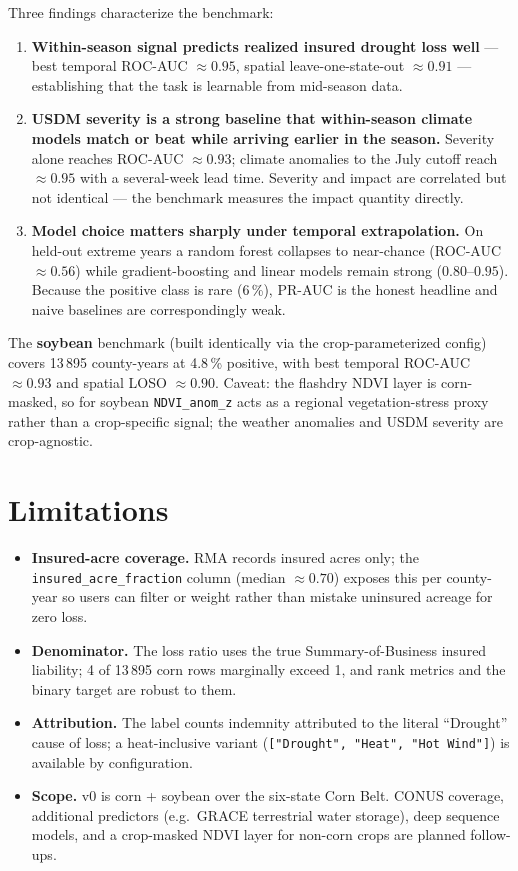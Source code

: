 \documentclass[essd, manuscript]{copernicus}
\begin{document}
Three findings characterize the benchmark:
\begin{enumerate}
\item \textbf{Within-season signal predicts realized insured drought loss well} --- best temporal ROC-AUC $\approx 0.95$, spatial leave-one-state-out $\approx 0.91$ --- establishing that the task is learnable from mid-season data.
\item \textbf{USDM severity is a strong baseline that within-season climate models match or beat while arriving earlier in the season.} Severity alone reaches ROC-AUC $\approx 0.93$; climate anomalies to the July cutoff reach $\approx 0.95$ with a several-week lead time. Severity and impact are correlated but not identical --- the benchmark measures the impact quantity directly.
\item \textbf{Model choice matters sharply under temporal extrapolation.} On held-out extreme years a random forest collapses to near-chance (ROC-AUC $\approx 0.56$) while gradient-boosting and linear models remain strong ($0.80$--$0.95$). Because the positive class is rare (6\,\%), PR-AUC is the honest headline and naive baselines are correspondingly weak.
\end{enumerate}

The \textbf{soybean} benchmark (built identically via the crop-parameterized config) covers 13\,895 county-years at 4.8\,\% positive, with best temporal ROC-AUC $\approx 0.93$ and spatial LOSO $\approx 0.90$. Caveat: the flashdry NDVI layer is corn-masked, so for soybean \texttt{NDVI\_anom\_z} acts as a regional vegetation-stress proxy rather than a crop-specific signal; the weather anomalies and USDM severity are crop-agnostic.

\section{Limitations}
\label{sec:limitations}
\begin{itemize}
\item \textbf{Insured-acre coverage.} RMA records insured acres only; the \texttt{insured\_acre\_fraction} column (median $\approx 0.70$) exposes this per county-year so users can filter or weight rather than mistake uninsured acreage for zero loss.
\item \textbf{Denominator.} The loss ratio uses the true Summary-of-Business insured liability; 4 of 13\,895 corn rows marginally exceed 1, and rank metrics and the binary target are robust to them.
\item \textbf{Attribution.} The label counts indemnity attributed to the literal ``Drought'' cause of loss; a heat-inclusive variant (\texttt{["Drought", "Heat", "Hot Wind"]}) is available by configuration.
\item \textbf{Scope.} v0 is corn + soybean over the six-state Corn Belt. CONUS coverage, additional predictors (e.g.\ GRACE terrestrial water storage), deep sequence models, and a crop-masked NDVI layer for non-corn crops are planned follow-ups.
\end{itemize}
\end{document}
